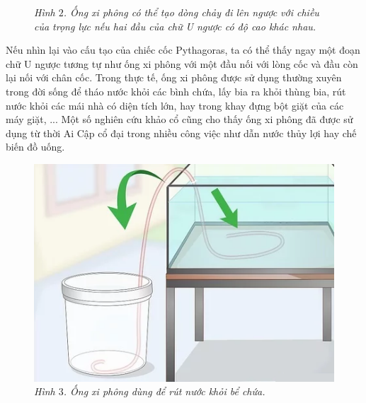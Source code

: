 \begin{multicols}{2}
\begin{figure}[H]
		\caption{\small\textit{\color{quantoan}Hình $2$. Ống xi phông có thể tạo dòng chảy đi lên ngược với chiều của trọng lực nếu hai đầu của chữ U ngược có độ cao khác nhau.}}
		\vspace*{-10pt}
	\end{figure}
	Nếu nhìn lại vào cấu tạo của chiếc cốc Pythagoras, ta có thể thấy ngay một đoạn chữ U ngược tương tự như ống xi phông với một đầu nối với lòng cốc và đầu còn lại nối với chân cốc. Trong thực tế, ống xi phông được sử dụng thường xuyên trong đời sống để tháo nước khỏi các bình chứa, lấy bia ra khỏi thùng bia, rút nước khỏi các mái nhà có diện tích lớn, hay trong khay đựng bột giặt của các máy giặt, ...  Một số nghiên cứu khảo cổ cũng cho thấy ống xi phông đã được sử dụng từ thời Ai Cập cổ đại trong nhiều công việc như dẫn nước thủy lợi hay chế biến đồ uống. 
	\begin{figure}[H]
		\vspace*{-5pt}
		\centering
		\captionsetup{labelformat= empty, justification=centering}
		\includegraphics[width= 1\linewidth]{3}
		\caption{\small\textit{\color{quantoan}Hình $3$. Ống xi phông dùng để rút nước khỏi bể chứa.}}
		\vspace*{-10pt}
	\end{figure}
\end{multicols}